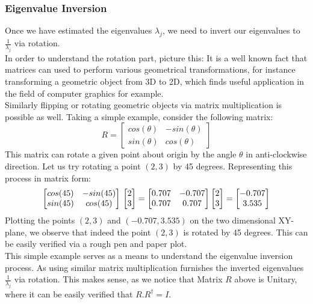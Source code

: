 \documentclass[12pt]{article}
\begin{document}
\subsubsection{Eigenvalue Inversion}
Once we have estimated the eigenvalues $\lambda_j$, we need to invert our eigenvalues to $\frac{1}{\lambda_j}$ via rotation.\\
In order to understand the rotation part, picture this: It is a well known fact that matrices can used to perform various geometrical transformations, for instance transforming a geometric object from 3D to 2D, which finds useful application in the field of computer graphics for example.\\
Similarly flipping or rotating geometric objects via matrix multiplication is possible as well. Taking a simple example, consider the following matrix: 
\begin{displaymath}
R = \begin{bmatrix}
cos(\theta) & -sin(\theta)\\
sin(\theta) & cos(\theta)
\end{bmatrix}
\end{displaymath}
This matrix can rotate a given point about origin by the angle $\theta$ in anti-clockwise direction. Let us try rotating a point $(2,3)$ by 45 degrees. Representing this process in matrix form: 
\begin{displaymath}
\begin{bmatrix}
cos(45) & -sin(45)\\
sin(45) & cos(45)
\end{bmatrix} \\ \begin{bmatrix}
2\\
3
\end{bmatrix} = \begin{bmatrix}
0.707 & -0.707\\
0.707 & 0.707
\end{bmatrix} \begin{bmatrix}
2 \\
3
\end{bmatrix} = \begin{bmatrix}
-0.707 \\
3.535
\end{bmatrix}
\end{displaymath}
Plotting the points $(2,3)$ and $(-0.707, 3.535)$ on the two dimensional XY-plane, we observe that indeed the point $(2,3)$ is rotated by 45 degrees. This can be easily verified via a rough pen and paper plot.\\
This simple example serves as a means to understand the eigenvalue inversion process. As using similar matrix multiplication furnishes the inverted eigenvalues $\frac{1}{\lambda_j}$ via rotation. This makes sense, as we notice that Matrix $R$ above is Unitary, where it can be easily verified that $R.R^\dagger = I$.
\end{document}
